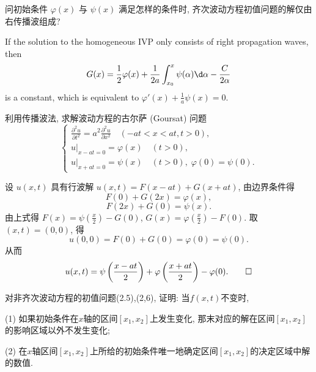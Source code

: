 \begin{exercise}
  问初始条件 $\varphi(x)$ 与 $\psi(x)$ 满足怎样的条件时,
  齐次波动方程初值问题的解仅由右传播波组成?
\end{exercise}

\begin{solution}
  If the solution to the homogeneous IVP only consists of right propagation
  waves, then
  \[ G(x) = \frac12\varphi(x) + \frac{1}{2a}\int_{x_0}^x \psi(\alpha) \d\alpha
    - \frac{C}{2\alpha} \]
  is a constant, which is equivalent to $\varphi'(x) + \frac1a \psi(x) = 0$.
\end{solution}


\begin{exercise}[3]
  利用传播波法, 求解波动方程的古尔萨 (Goursat) 问题
  \[\begin{cases}
    \displaystyle\frac{\partial^2u}{\partial t^2} = a^2 \frac{\partial^2u}{\partial x^2}\quad(-at<x<at,t>0),\\
    u|_{x-at=0} = \varphi(x)\quad(t>0),\\
    u|_{x+at=0} = \psi(x)\quad(t>0),\; \varphi(0) = \psi(0).
  \end{cases}\]
\end{exercise}

\begin{solve}
  设 $u(x,t)$ 具有行波解 $u(x,t) = F(x-at)+G(x+at)$, 由边界条件得
  \[F(0)+G(2x) = \varphi(x),\]
  \[F(2x)+G(0) = \psi(x).\]
  由上式得 $\displaystyle F(x) = \psi\left(\frac x2\right)-G(0)$, $\displaystyle G(x) = \varphi\left(\frac x2\right)-F(0)$.
  取 $(x,t) = (0,0)$, 得
  \[u(0,0) = F(0) + G(0) = \varphi(0) = \psi(0).\]
  从而
  \[ u(x,t) = \psi\left(\frac{x-at}{2}\right)
    + \varphi\left(\frac{x+at}{2}\right)-\varphi(0). \qedhere\]
\end{solve}


\begin{exercise}
	对非齐次波动方程的初值问题(2.5),(2,6), 证明: 当$f(x,t)$不变时,
	
	(1) 如果初始条件在$x$轴的区间$[x_1,x_2]$上发生变化, 那末对应的解在区间$[x_1,x_2]$的影响区域以外不发生变化;
	
	(2) 在$x$轴区间$[x_1,x_2]$上所给的初始条件唯一地确定区间$[x_1,x_2]$的决定区域中解的数值.
\end{exercise}

